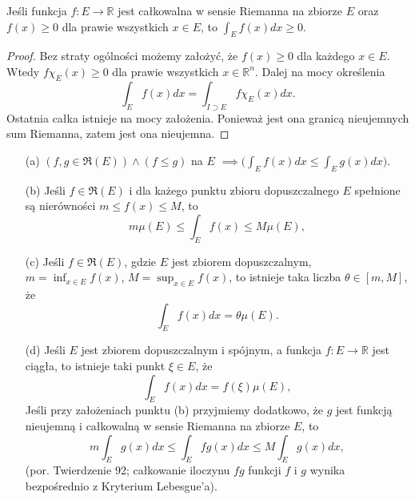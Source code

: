 \documentclass[leqno]{article}
\begin{document}
\begin{justify}
\begin{theorem}
{
    Jeśli funkcja $f : E \to \mathbb{R}$ jest całkowalna w sensie Riemanna na zbiorze $E$ oraz $f(x) \geqslant 0$ dla prawie wszystkich $x \in E$, to $\int_{E}f(x)dx \geqslant 0$.
}
\end{theorem}

\begin{proof}
    Bez straty ogólności możemy założyć, że $f(x) \geqslant 0$ dla każdego $x \in E$. Wtedy $f\chi_E(x) \geqslant 0$ dla prawie wszystkich $x \in \mathbb{R}^n$.
    Dalej na mocy określenia 
    \[
        \int_E f(x)dx = \int_{I \supset E}f\chi_E(x)dx.
    \]
    Ostatnia całka istnieje na mocy założenia. Ponieważ jest ona granicą nieujemnych sum Riemanna, zatem jest ona nieujemna.
\end{proof}

\begin{wniosek}
{
    \begin{itemize}
        \item [(a)] $(f,g \in \mathfrak{R}(E)) \land (f \leqslant g)$ na $E$ $\implies \Big( \int_{E}f(x)dx \leqslant \int_{E}g(x)dx\Big)$.
        \item [(b)] 
            Jeśli $f \in \mathfrak{R}(E)$ i dla każego punktu zbioru dopuszczalnego $E$ spełnione są nierówności $m \leqslant f(x) \leqslant M$, to
            \[
                m \mu(E) \leqslant \int_{E}f(x) \leqslant M \mu(E),
            \]
        \item [(c)]
            Jeśli $f \in \mathfrak{R}(E)$, gdzie $E$ jest zbiorem dopuszczalnym, $m = \inf_{x \in E}f(x)$, $M = \sup_{x \in E}f(x)$, to istnieje
            taka liczba $\theta \in [m, M]$, że 
            \[
                \int_{E}f(x)dx = \theta \mu(E).
            \]
        \item [(d)]
            Jeśli $E$ jest zbiorem dopuszczalnym i spójnym, a funkcja $f : E \to \mathbb{R}$ jest ciągła, to istnieje taki punkt $\xi \in E$, że 
            \[
                \int_{E}f(x)dx = f(\xi)\mu(E),
            \]
            Jeśli przy założeniach punktu (b) przyjmiemy dodatkowo, że $g$ jest funkcją nieujemną i całkowalną w sensie Riemanna na zbiorze $E$, to 
            \[
                m \int_E g(x)dx \leqslant \int_E fg(x)dx \leqslant M \int_E g(x)dx,
            \]
            (por. Twierdzenie 92; całkowanie iloczynu $fg$ funkcji $f$ i $g$ wynika bezpośrednio z Kryterium Lebesgue'a).
    \end{itemize}
}
\end{wniosek}


\end{justify}
\end{document}
